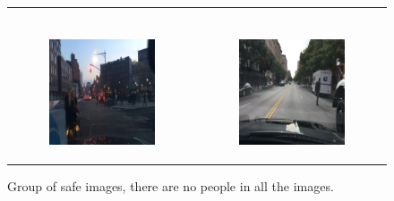 \begin{figure}
\begin{tabular}{p{\horspace} p{\horspace}}
\begin{subfigure}[b]{\subfigwidth}
    \end{subfigure} \\
    \begin{subfigure}[b]{\subfigwidth}
        \includegraphics[width=\subfigwidth]{images/gpt4/d7.jpg}
    \end{subfigure}
    \hfill &
    \begin{subfigure}[b]{\subfigwidth}
        \includegraphics[width=\subfigwidth]{images/gpt4/d6.jpg}
    \end{subfigure}
\end{tabular}
\caption{Group of safe images, there are no people in all the images.}
\label{fig:sub_safe_group}
\end{figure}
